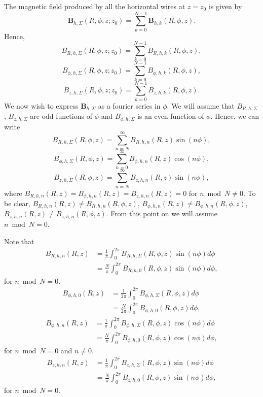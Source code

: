 \documentclass{article}
\let\vec\mathbf
\begin{document}
The magnetic field produced by all the horizontal wires at $z=z_0$ is given by
\[\vec{B}_{h,\Sigma}(R, \phi, z; z_0) = \sum_{k=0}^{N-1}\vec{B}_{h,k}(R, \phi, z).\]
Hence,
\[B_{R, h,\Sigma}(R, \phi, z; z_0) = \sum_{k=0}^{N-1}B_{R, h,k}(R, \phi, z),\]
\[B_{\phi, h,\Sigma}(R, \phi, z; z_0) = \sum_{k=0}^{N-1}B_{\phi, h,k}(R, \phi, z),\]
\[B_{z, h,\Sigma}(R, \phi, z; z_0) = \sum_{k=0}^{N-1}B_{z, h,k}(R, \phi, z).\]
We now wish to express $\vec{B}_{h,\Sigma}$ as a fourier series in $\phi$.
We will assume that $B_{R, h,\Sigma}$, $B_{z, h,\Sigma}$ are odd functions of $\phi$ and
$B_{\phi, h,\Sigma}$ is an even function of $\phi$.
Hence, we can write
\[B_{R, h,\Sigma}(R, \phi, z) = \sum_{n=N}^{\infty}B_{R, h, n}(R, z)\sin(n\phi),\]
\[B_{\phi, h,\Sigma}(R, \phi, z) = \sum_{n=0}^{\infty}B_{\phi, h, n}(R, z)\cos(n\phi),\]
\[B_{z, h,\Sigma}(R, \phi, z) = \sum_{n=N}^{\infty}B_{z, h, n}(R, z)\sin(n\phi),\]
where $B_{R, h, n}(R, z)=B_{\phi, h, n}(R, z)=B_{z, h, n}(R, z)=0$ for $n \bmod N \ne 0$.
To be clear, $B_{R, h, n}(R, z)\ne B_{R, h, n}(R, \phi, z)$, $B_{\phi, h, n}(R, z)\ne B_{\phi, h, n}(R, \phi, z)$,
$B_{z, h, n}(R, z)\ne B_{z, h, n}(R, \phi, z)$. From this point on we will assume $n \bmod N = 0$.

Note that
\[\begin{aligned}
B_{R, h, n}(R, z)&=\frac{1}{\pi}\int_{0}^{2\pi}B_{R, h,\Sigma}(R, \phi, z)\sin(n\phi)d\phi \\
&= \frac{N}{\pi}\int_0^{2\pi} B_{R, h, 0}(R, \phi, z)\sin(n\phi)d\phi,
\end{aligned}\]
for $n \bmod N = 0$.
\[\begin{aligned}
B_{\phi, h, 0}(R, z)&=\frac{1}{2\pi}\int_{0}^{2\pi}B_{\phi, h,\Sigma}(R, \phi, z)d\phi \\
&= \frac{N}{2\pi}\int_0^{2\pi} B_{\phi, h, 0}(R, \phi, z)d\phi,
\end{aligned}\]
\[\begin{aligned}
B_{\phi, h, n}(R, z)&=\frac{1}{\pi}\int_{0}^{2\pi}B_{\phi, h,\Sigma}(R, \phi, z)\cos(n\phi)d\phi \\
&= \frac{N}{\pi}\int_0^{2\pi} B_{\phi, h, 0}(R, \phi, z)\cos(n\phi)d\phi,
\end{aligned}\]
for $n \bmod N = 0$ and $n\ne0$.
\[\begin{aligned}
B_{z, h, n}(R, z)&=\frac{1}{\pi}\int_{0}^{2\pi}B_{z, h,\Sigma}(R, \phi, z)\sin(n\phi)d\phi \\
&= \frac{N}{\pi}\int_0^{2\pi} B_{z, h, 0}(R, \phi, z)\sin(n\phi)d\phi,
\end{aligned}\]
for $n \bmod N = 0$.
\end{document}
